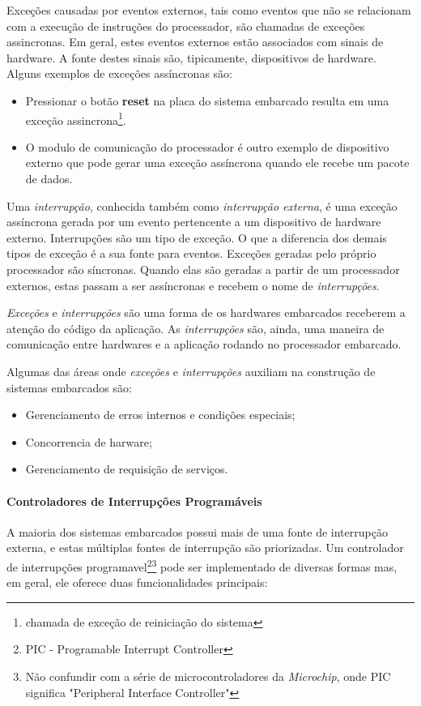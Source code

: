 Exceções causadas por eventos externos, tais como eventos que não se relacionam com a execução de instruções do processador, são chamadas de exceções assincronas. Em geral, estes eventos externos estão associados com sinais de hardware. A fonte destes sinais são, tipicamente, dispositivos de hardware. Alguns exemplos de exceções assíncronas são:

\begin{itemize}
	\item Pressionar o botão \textbf{reset} na placa do sistema embarcado resulta em uma exceção assincrona\footnote{chamada de exceção de reiniciação do sistema}.
	\item O modulo de comunicação do processador é outro exemplo de dispositivo externo que pode gerar uma exceção assíncrona quando ele recebe um pacote de dados.
\end{itemize}

Uma \emph{interrupção}, conhecida também como \emph{interrupção externa}, é uma exceção assíncrona gerada por um evento pertencente a um dispositivo de hardware externo. Interrupções são um tipo de exceção. O que a diferencia dos demais tipos de exceção é a sua fonte para eventos. Exceções geradas pelo próprio processador são síncronas. Quando elas são geradas a partir de um processador externos, estas passam a ser assíncronas e recebem o nome de \emph{interrupções}.

\emph{Exceções} e \emph{interrupções} são uma forma de os hardwares embarcados receberem a atenção do código da aplicação. As \emph{interrupções} são, ainda, uma maneira de comunicação entre hardwares e a aplicação rodando no processador embarcado.

Algumas das áreas onde \emph{exceções} e \emph{interrupções} auxiliam na construção de sistemas embarcados são:

\begin{itemize}
	\item Gerenciamento de erros internos e condições especiais;
	\item Concorrencia de harware;
	\item Gerenciamento de requisição de serviços.
\end{itemize}

\paragraph{Controladores de Interrupções Programáveis}

A maioria dos sistemas embarcados possui mais de uma fonte de interrupção externa, e estas múltiplas fontes de interrupção são priorizadas. Um controlador de interrupções programavel\footnote{PIC - Programable Interrupt Controller}\footnote{Não confundir com a série de microcontroladores da \emph{Microchip}, onde PIC significa "Peripheral Interface Controller"} pode ser implementado de diversas formas mas, em geral, ele oferece duas funcionalidades principais:

